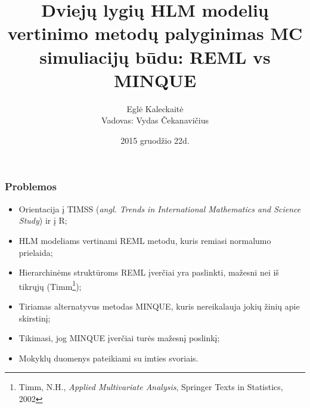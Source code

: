 \documentclass[utf8,hyperref={unicode,pdftex}]{beamer}
\title[\hspace{130pt} p. \insertpagenumber\enspace iš \insertdocumentendpage\enspace ]{Dviejų lygių HLM modelių vertinimo metodų palyginimas MC simuliacijų būdu: REML vs MINQUE}
\author[ E. Kaleckaitė]{Eglė Kaleckaitė\\
Vadovas: Vydas Čekanavičius}
\institute{Vilniaus Universitetas, Matematikos ir Informatikos Fakultetas}
\date{2015 gruodžio 22d.}
\begin{document}
\begin{frame}
\titlepage
\end{frame}

\begin{frame}
\frametitle{Problemos}
\begin{itemize}
\item Orientacija į TIMSS (\textit{angl. Trends in International Mathematics and Science Study}) ir į R;
\item HLM modeliams vertinami REML metodu, kuris remiasi normalumo prielaida;
\item Hierarchinėms struktūroms REML įverčiai yra paslinkti, mažesni nei iš tikrųjų (Timm\footnote{Timm, N.H., \textit{Applied Multivariate Analysis}, Springer Texts in Statistics, 2002});
\item Tiriamas alternatyvus metodas MINQUE, kuris nereikalauja jokių žinių apie skirstinį;
\item Tikimasi, jog MINQUE įverčiai turės mažesnį poslinkį;
\item Mokyklų duomenys pateikiami su imties svoriais.
\end{itemize}
\end{frame}
\end{document}
